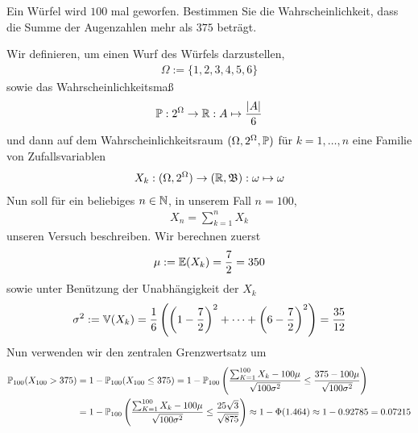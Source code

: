 \begin{exercise}

Ein Würfel wird $100$ mal geworfen. Bestimmen Sie die Wahrscheinlichkeit, dass die Summe der Augenzahlen mehr als $375$ beträgt.

\end{exercise}

\begin{solution}

Wir definieren, um einen Wurf des Würfels darzustellen,
\begin{align*}
    \Omega := \{1,2,3,4,5,6\}
\end{align*}
sowie das Wahrscheinlichkeitsmaß
\begin{align*}
    \P:2^{\Omega} \to \R: A \mapsto  \frac{\vert A \vert}{6}
\end{align*}
und dann auf dem Wahrscheinlichkeitsraum $(\Omega,2^{\Omega},\P)$ für $k= 1,\dots,n$ eine Familie von Zufallsvariablen
\begin{align*}
    X_k:(\Omega,2^{\Omega}) \to (\R,\B): \omega \mapsto \omega
\end{align*}
Nun soll für ein beliebiges $n \in \N$, in unserem Fall $n=100$,
\begin{align*}
    X_n = \sum_{k=1}^{n}X_k
\end{align*}
unseren Versuch beschreiben. Wir berechnen zuerst
\begin{align*}
    \mu := \E(X_k) = \frac{7}{2} = 350
\end{align*}
sowie unter Benützung der Unabhängigkeit der $X_k$
\begin{align*}
    \sigma^2 := \V(X_k) = \frac{1}{6} \pbraces{\pbraces{1-\frac{7}{2}}^2+\cdots+\pbraces{6-\frac{7}{2}}^2} = \frac{35}{12}
\end{align*}
Nun verwenden wir den zentralen Grenzwertsatz um
\begin{align*}
    \P_{100}(X_{100} > 375) &= 1 - \P_{100}(X_{100} \leq 375) = 1 - \P_{100}\pbraces{\frac{\sum_{K=1}^{100}X_k - 100\mu}{\sqrt{100\sigma^2}} \leq \frac{375 - 100\mu}{\sqrt{100\sigma^2}}} \\
    &= 1 - \P_{100}\pbraces{\frac{\sum_{K=1}^{100}X_k - 100\mu}{\sqrt{100\sigma^2}} \leq \frac{25\sqrt{3}}{\sqrt{875}}} \approx 1 - \Phi(1.464) \approx 1 - 0.92785 = 0.07215
\end{align*}
\end{solution}
